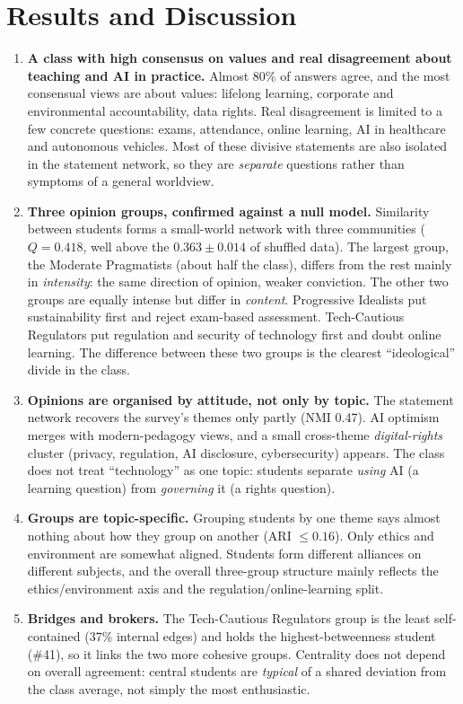 \documentclass[11pt,a4paper]{article}
\begin{document}
\section{Results and Discussion}
\begin{enumerate}[leftmargin=1.3em]
\item \textbf{A class with high consensus on values and real disagreement about teaching and AI in practice.}
Almost 80\% of answers agree, and the most consensual views are about values: lifelong learning, corporate and
environmental accountability, data rights. Real disagreement is limited to a few concrete questions: exams,
attendance, online learning, AI in healthcare and autonomous vehicles. Most of these divisive statements are also
isolated in the statement network, so they are \emph{separate} questions rather than symptoms of a general worldview.

\item \textbf{Three opinion groups, confirmed against a null model.} Similarity between students forms a
small-world network with three communities ($Q=0.418$, well above the $0.363\pm0.014$ of shuffled data). The largest
group, the Moderate Pragmatists (about half the class), differs from the rest mainly in \emph{intensity}: the same direction
of opinion, weaker conviction. The other two groups are equally intense but differ in \emph{content}.
Progressive Idealists put sustainability first and reject exam-based assessment. Tech-Cautious Regulators
put regulation and security of technology first and doubt online learning. The difference between these two groups is
the clearest ``ideological'' divide in the class.

\item \textbf{Opinions are organised by attitude, not only by topic.} The statement network recovers the survey's
themes only partly (NMI 0.47). AI optimism merges with modern-pedagogy views, and a small cross-theme
\emph{digital-rights} cluster (privacy, regulation, AI disclosure, cybersecurity) appears. The class does not treat
``technology'' as one topic: students separate \emph{using} AI (a learning question) from \emph{governing} it (a
rights question).

\item \textbf{Groups are topic-specific.} Grouping students by one theme says almost nothing about how they group on
another (ARI $\le0.16$). Only ethics and environment are somewhat aligned. Students form different alliances
on different subjects, and the overall three-group structure mainly reflects the ethics/environment axis and
the regulation/online-learning split.

\item \textbf{Bridges and brokers.} The Tech-Cautious Regulators group is the least self-contained (37\% internal edges)
and holds the highest-betweenness student (\#41), so it links the two more cohesive groups. Centrality does not
depend on overall agreement: central students are \emph{typical} of a shared deviation from the class average,
not simply the most enthusiastic.
\end{enumerate}
\end{document}
